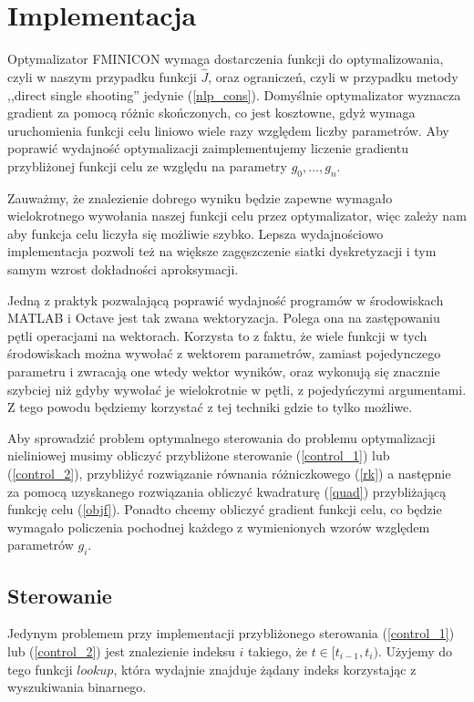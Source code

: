 \documentclass[licencjacka]{pracamgr}
\begin{document}
\chapter{Implementacja}
Optymalizator FMINICON wymaga dostarczenia funkcji do optymalizowania, czyli w naszym przypadku funkcji $\hat{J}$, oraz ograniczeń, czyli w przypadku metody ,,direct single shooting'' jedynie (\ref{nlp_cons}). Domyślnie optymalizator wyznacza gradient za pomocą różnic skończonych, co jest kosztowne, gdyż wymaga uruchomienia funkcji celu liniowo wiele razy względem liczby parametrów. Aby poprawić wydajność optymalizacji zaimplementujemy liczenie gradientu przybliżonej funkcji celu ze względu na parametry $g_0,\ldots, g_n$.

Zauważmy, że znalezienie dobrego wyniku będzie zapewne wymagało wielokrotnego wywołania naszej funkcji celu przez optymalizator, więc zależy nam aby funkcja celu liczyła się możliwie szybko. Lepsza wydajnościowo implementacja pozwoli też na większe zagęszczenie siatki dyskretyzacji i tym samym wzrost dokładności aproksymacji.

Jedną z praktyk pozwalającą poprawić wydajność programów w środowiskach MATLAB i Octave jest tak zwana wektoryzacja. Polega ona na zastępowaniu pętli operacjami na wektorach. Korzysta to z faktu, że wiele funkcji w tych środowiskach można wywołać z wektorem parametrów, zamiast pojedynczego parametru i zwracają one wtedy wektor wyników, oraz wykonują się znacznie szybciej niż gdyby wywołać je wielokrotnie w pętli, z pojedyńczymi argumentami. Z tego powodu będziemy korzystać z tej techniki gdzie to tylko możliwe.

Aby sprowadzić problem optymalnego sterowania do problemu optymalizacji nieliniowej musimy obliczyć przybliżone sterowanie (\ref{control_1}) lub (\ref{control_2}), przybliżyć rozwiązanie równania różniczkowego (\ref{rk}) a następnie za pomocą uzyskanego rozwiązania obliczyć kwadraturę (\ref{quad}) przybliżającą funkcję celu (\ref{objf}). Ponadto chcemy obliczyć gradient funkcji celu, co będzie wymagało policzenia pochodnej każdego z wymienionych wzorów względem parametrów $g_i$.

\section{Sterowanie}\label{subsec_sterowanie}
Jedynym problemem przy implementacji przybliżonego sterowania (\ref{control_1}) lub (\ref{control_2}) jest znalezienie indeksu $i$ takiego, że $t \in [t_{i-1}, t_i)$. Użyjemy do tego funkcji $lookup$, która wydajnie znajduje żądany indeks korzystając z wyszukiwania binarnego.
\end{document}
